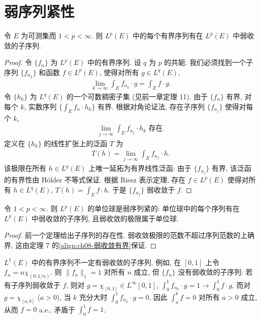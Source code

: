 \documentclass[../../main.tex]{subfiles}
\begin{document}
\section{弱序列紧性}\label{section:ch08-弱序列紧性}

\begin{theorem}\label{theorem:ch08-有界序列弱收敛子列}
令 $E$ 为可测集而 $1<p<\infty$. 则 $L^{p}(E)$ 中的每个有界序列有在 $L^{p}(E)$ 中弱收敛的子序列.
\end{theorem}

\begin{proof}
令 $\{f_{n}\}$ 为 $L^{p}(E)$ 中的有界序列. 设 $q$ 为 $p$ 的共轭. 我们必须找到一个子序列 $\{f_{n_{k}}\}$ 和函数 $f\in L^{p}(E)$, 使得对所有 $g\in L^{q}(E)$,
\begin{align*}
\lim_{k\to\infty}\int_{E}f_{n_{k}}\cdot g=\int_{E}f\cdot g.
\end{align*}
令 $\{h_{k}\}$ 为 $L^{q}(E)$ 的一个可数稠密子集 (见前一章定理 11). 由于 $\{f_{n}\}$ 有界, 对每个 $k$, 实数序列 $\{\int_{E}f_{n}\cdot h_{k}\}$ 有界. 根据对角论证法, 存在子序列 $\{f_{n_{j}}\}$ 使得对每个 $k$,
\begin{align}
\lim_{j\to\infty}\int_{E}f_{n_{j}}\cdot h_{k}\text{ 存在}.\label{align:ch08-对角极限}
\end{align}
定义在 $\{h_{k}\}$ 的线性扩张上的泛函 $T$ 为
\begin{align*}
T(h)=\lim_{j\to\infty}\int_{E}f_{n_{j}}\cdot h.
\end{align*}
该极限在所有 $h\in L^{q}(E)$ 上唯一延拓为有界线性泛函: 由于 $\{f_{n_{j}}\}$ 有界, 该泛函的有界性由 H\"older 不等式保证. 根据 Riesz 表示定理, 存在 $f\in L^{p}(E)$ 使得对所有 $h\in L^{q}(E)$, $T(h)=\int_{E}f\cdot h$. 于是 $\{f_{n_{j}}\}$ 弱收敛于 $f$.
\end{proof}

\begin{theorem}[Helly 定理]\label{theorem:ch08-Helly}
令 $1<p<\infty$. 则 $L^{p}(E)$ 的单位球是弱序列紧的: 单位球中的每个序列有在 $L^{p}(E)$ 中弱收敛的子序列, 且弱收敛的极限属于单位球.
\end{theorem}

\begin{proof}
前一个定理给出子序列的存在性. 弱收敛极限的范数不超过序列范数的上确界, 这由定理 7 的\eqref{align:ch08-弱收敛有界}保证.
\end{proof}

\begin{example}\label{example:ch08-L1无弱收敛子列}
$L^{1}(E)$ 中的有界序列不一定有弱收敛的子序列. 例如, 在 $[0,1]$ 上令 $f_{n}=n\chi_{(0,1/n)}$. 则 $\|f_{n}\|_{1}=1$ 对所有 $n$ 成立, 但 $\{f_{n}\}$ 没有弱收敛的子序列: 若有子序列弱收敛于 $f$, 则对 $g=\chi_{[0,1]}\in L^{\infty}[0,1]$, $\int_{0}^{1}f_{n_{k}}\cdot g=1\to\int_{0}^{1}f\cdot g$, 而对 $g=\chi_{[a,b]}$ ($a>0$), 当 $k$ 充分大时 $\int_{0}^{1}f_{n_{k}}\cdot g=0$, 因此 $\int_{a}^{b}f=0$ 对所有 $a>0$ 成立, 从而 $f=0$ a.e., 矛盾于 $\int_{0}^{1}f=1$.
\end{example}
\end{document}
